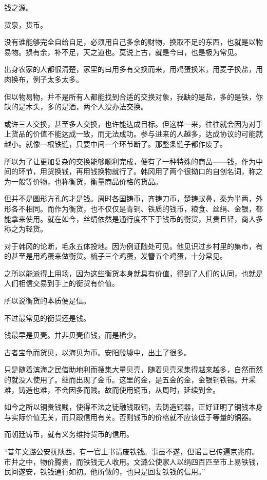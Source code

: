 钱之源。

货泉，货币。

没有谁能够完全自给自足，必须用自己多余的财物，换取不足的东西，也就是以物易物。损有余，补不足，天之道也。莫说上古，就是今曰，也是极为常见。

出身农家的人都很清楚，家里的曰用多有交换而来，用鸡蛋换米，用麦子换盐，用肉换布，例子太多太多。

但以物易物，并不是所有人都能找到合适的交换对象，我缺的是盐，多的是铁，你缺的是木头，多的是酒，两个人没办法交换。

或许三人交换，甚至多人交换，也许能达成目标。但这样一来，往往就会因为对手上货品的价值不能达成一致，而无法成功。参与进来的人越多，达成协议的可能就越小。就像一根铁链，只要中间一个环节断了。那整条链子都作废了。

所以为了让更加复杂的交换能够顺利完成，便有了一种特殊的商品——钱，作为中间的环节，用货换钱，再用钱换物就行了。韩冈用了两个很拗口的自创名词，称之为一般等价物，也称衡货，衡量商品价格的货品。

但并不是圆形方孔的才是钱。周时各国铸币，齐铸刀币，楚铸蚁鼻，秦为半两，外形各不相同。而作为衡货，也不仅仅是青铜、铁质的钱币，粮食、丝绢、金银，都能拿来使用。就在如今，丝绢依然是通行度不下于钱币的衡货，其贵且轻，商人多称之为轻货。

对于韩冈的论断，毛永五体投地。因为例证随处可见。他见识过乡村里的集市，有的甚至是用鸡蛋来做衡货。梳子三个鸡蛋，发簪五个鸡蛋，十分常见。

之所以能派得上用场，因为这些衡货本身就具有价值，得到了人们的认同，也就是人们相信交易到手上的衡货有价值。

所以说衡货的本质便是信。

不过最常见的衡货还是钱。

钱最早是贝壳。并非贝壳值钱，而是稀少。

古者宝龟而货贝，以海贝为币。安阳殷墟中，出土了很多。

只是随着滨海之民借助地利而搜集大量贝壳，随着贝壳采集得越来越多，自然而然的就没人使用了。继而出现了金币。这里的金，是五金的金，金银铜铁锡。开采难，铸造也难，不会因多而贱。故而使用铜币，从周时，延续到金。

如今之所以铜贵钱贱，使得不法之徒融钱取铜，去铸造铜器，正好证明了铜钱本身与实际价值无关，而只跟信用有关。否则钱币的价格就不应该低于等量的铜器。

而朝廷铸币，就有义务维持货币的信用。

“昔年文潞公安抚陕西，有一官上书请废铁钱。事虽不遂，但谣言已传遍京兆府。市井之中，物价腾贵，而铁钱无人收用。文潞公使家人以绢四百匹至市上易铁钱，民间遂安，铁钱通行如初。他所做的，也只是回复铁钱的信用。”


